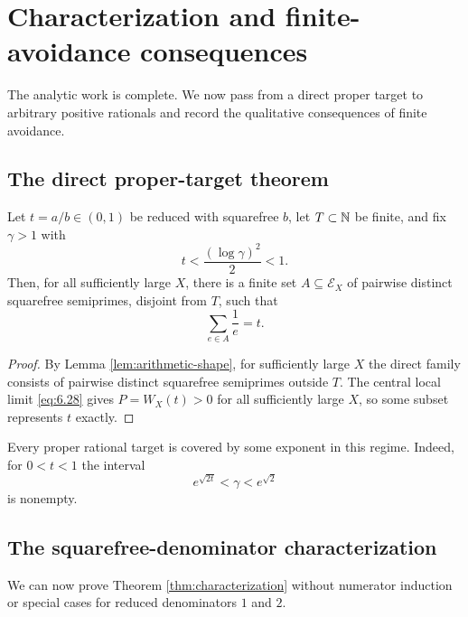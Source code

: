 \section{Characterization and finite-avoidance consequences}\label{sec:characterization}

The analytic work is complete. We now pass from a direct proper target to arbitrary positive rationals and record the qualitative consequences of finite avoidance.

\subsection{The direct proper-target theorem}

\begin{theorem}\label{thm:avoiding-target}
Let $t=a/b\in(0,1)$ be reduced with squarefree $b$, let $T\subset\mathbb N$ be finite, and fix $\gamma>1$ with
\[
t<\frac{(\log\gamma)^2}{2}<1.
\]
Then, for all sufficiently large $X$, there is a finite set $A\subseteq\mathcal E_X$ of pairwise distinct squarefree semiprimes, disjoint from $T$, such that
\[
\sum_{e\in A}\frac1e=t.
\tag{9.1}\label{eq:9.1}
\]
\end{theorem}

\begin{proof}
By Lemma \ref{lem:arithmetic-shape}, for sufficiently large $X$ the direct family consists of pairwise distinct squarefree semiprimes outside $T$. The central local limit \eqref{eq:6.28} gives $P=W_X(t)>0$ for all sufficiently large $X$, so some subset represents $t$ exactly.
\end{proof}

Every proper rational target is covered by some exponent in this regime. Indeed, for $0<t<1$ the interval
\[
e^{\sqrt{2t}}
<\gamma<e^{\sqrt2}
\tag{9.2}\label{eq:9.2}
\]
is nonempty.

\subsection{The squarefree-denominator characterization}

We can now prove Theorem \ref{thm:characterization} without numerator induction or special cases for reduced denominators $1$ and $2$.

